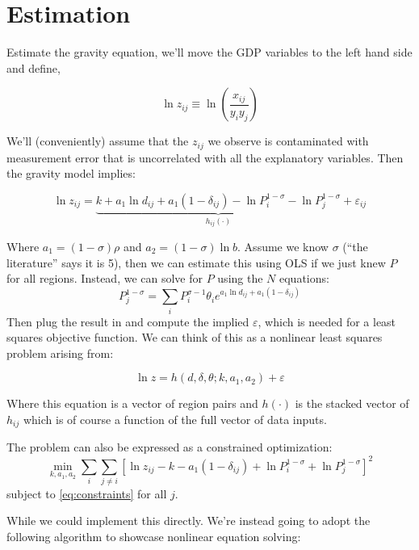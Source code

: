 \documentclass[twoside]{article}
\begin{document}
\section{Estimation}

Estimate the gravity equation, we'll move the GDP variables to the left hand side and define, 

$$ \ln z_{ij} \equiv \ln \left( \frac{x_{ij}}{y_iy_j} \right) $$

We'll (conveniently) assume that the $z_{ij}$ we observe is contaminated with measurement error that is uncorrelated with all the explanatory variables. Then the gravity model implies: 

$$ \ln z_{ij} = \underbrace{k + a_1 \ln d_{ij} + a_1 (1 - \delta_{ij}) - \ln P_i^{1 - \sigma} - \ln P_j^{1 - \sigma}}_{h_{ij}(\cdot)} + \varepsilon_{ij}$$

Where $a_1 = (1 - \sigma)\rho$ and $a_2 = (1 - \sigma) \ln b$. 
Assume we know $\sigma$ (``the literature'' says it is 5), then we can estimate this using OLS if we just knew $P$ for all regions. Instead, we can solve for $P$ using the $N$ equations: 
\begin{equation} \label{eq:constraints}
 P_j^{1-\sigma} = \sum_i P_i^{\sigma - 1} \theta_i e^{a_1 \ln d_{ij} + a_1 (1 - \delta_{ij})} 
\end{equation}
Then plug the result in and compute the implied $\varepsilon$, which is needed for a least squares objective function. We can think of this as a nonlinear least squares problem arising from: 

$$ \ln z = h(d, \delta, \theta; k, a_1, a_2) + \varepsilon $$

Where this equation is a vector of region pairs and $h(\cdot)$ is the stacked vector of $h_{ij}$ which is of course a function of the full vector of data inputs.  

The problem can also be expressed as a constrained optimization: 
\begin{equation} \label{eq:opt}
 \min_{k, a_1, a_2} \sum_i \sum_{j \neq i} \left[ \ln z_{ij} - k - a_1 (1 - \delta_{ij}) + \ln P_i^{1 - \sigma} + \ln P_j^{1 - \sigma} \right]^2 
 \end{equation}
subject to \eqref{eq:constraints} for all $j$. 

While we could implement this directly. We're instead going to adopt the following algorithm to showcase nonlinear equation solving: 
\end{document}
